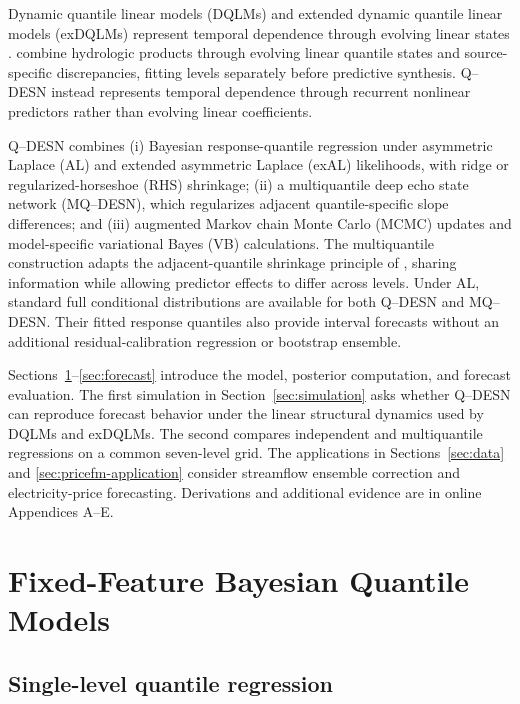 \documentclass[12pt,letterpaper]{article}
\numberwithin{equation}{section}
\begin{document}
Dynamic quantile linear models (DQLMs) and extended dynamic quantile linear
models (exDQLMs) represent temporal dependence through evolving linear states
\citep{GoncalvesMigonBastos2020DQLM,barata2021_flex_quantile}.
\citet{DeLeonPradoSanso2026HydrologicProducts} combine hydrologic products
through evolving linear quantile states and source-specific discrepancies,
fitting levels separately before predictive synthesis. Q--DESN instead
represents temporal dependence through recurrent nonlinear predictors rather
than evolving linear coefficients.

Q--DESN combines (i) Bayesian response-quantile regression under asymmetric
Laplace (AL) and extended asymmetric Laplace (exAL) likelihoods, with ridge
or regularized-horseshoe (RHS) shrinkage; (ii) a multiquantile deep echo state
network (MQ--DESN), which regularizes adjacent quantile-specific slope
differences; and (iii) augmented Markov chain Monte Carlo (MCMC) updates and
model-specific variational Bayes (VB) calculations. The multiquantile
construction adapts the adjacent-quantile shrinkage principle of
\citet{KohnsSzendrei2025QVP}, sharing information while allowing predictor
effects to differ across levels. Under AL, standard full conditional
distributions are available for both Q--DESN and MQ--DESN. Their fitted
response quantiles also provide interval forecasts without an additional
residual-calibration regression or bootstrap ensemble.

Sections~\ref{sec:model}--\ref{sec:forecast} introduce the model, posterior
computation, and forecast evaluation. The first simulation in
Section~\ref{sec:simulation} asks whether Q--DESN can reproduce forecast
behavior under the linear structural dynamics used by DQLMs and exDQLMs.
The second compares independent and multiquantile regressions on a common
seven-level grid. The applications in Sections~\ref{sec:data} and
\ref{sec:pricefm-application} consider streamflow ensemble correction and
electricity-price forecasting. Derivations and additional evidence are in
online Appendices A--E.

\section{Fixed-Feature Bayesian Quantile Models}
\label{sec:model}

\subsection{Single-level quantile regression}
\end{document}
